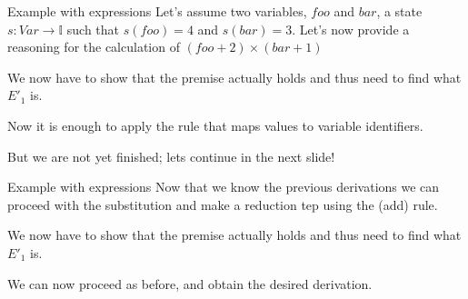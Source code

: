 \documentclass[aspectratio=169]{beamer}
\begin{document}
\begin{slide}{Example with expressions}
\small
Let's assume two variables, $foo$ and $bar$, a state $s : Var \to \mathbb{I}$ such that $s(foo) = 4$ and $s(bar) = 3$. Let's now provide a reasoning for the calculation of $(foo + 2) \times (bar + 1)$

\begin{prooftree}
\end{prooftree}

We now have to show that the premise actually holds and thus need to find what $E'_1$ is.  

\begin{prooftree}
\end{prooftree}

Now it is enough to apply the rule that maps values to variable identifiers.

\begin{prooftree}
\end{prooftree}
 But we are not yet finished; lets continue in the next slide!
\end{slide}

\begin{slide}{Example with expressions}
\small
Now that we know the previous derivations we can proceed with the substitution and make a reduction tep using the (add) rule.
\begin{prooftree}
\end{prooftree}

We now have to show that the premise actually holds and thus need to find what $E'_1$ is.  

\begin{prooftree}
\end{prooftree}

We can now proceed as before, and obtain the desired derivation.

\end{slide}
\end{document}
